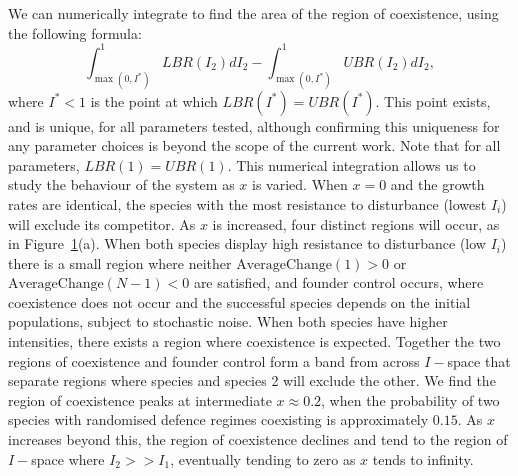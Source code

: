 \begin{figure}[htbp]
\label{gd}
\end{figure}
We can numerically integrate to find the area of the region of coexistence, using the following formula:
\begin{equation}
\int_{\max(0,I^*)}^1 LBR(I_2) dI_2 - \int_{\max(0,I^*)}^1  UBR(I_2) dI_2,
\end{equation}
where $I^*<1$ is the point at which $LBR(I^*)=UBR(I^*)$. This point exists, and is unique, for all parameters tested, although confirming this uniqueness for any parameter choices is beyond the scope of the current work. Note that for all parameters, $LBR(1)=UBR(1)$. This numerical integration allows us to study the behaviour of the system as $x$ is varied. When $x=0$ and the growth rates are identical, the species with the most resistance to disturbance (lowest $I_i$) will exclude its competitor.  As $x$ is increased, four distinct regions will occur, as in Figure~\ref{gd}(a). When both species display high resistance to disturbance (low $I_i$) there is a small region where neither $\text{AverageChange}(1)>0$ or $\text{AverageChange}(N-1)<0$ are satisfied, and founder control occurs, where coexistence does not occur and the successful species depends on the initial populations, subject to stochastic noise. When both species have higher intensities, there exists a region where coexistence is expected. Together the two regions of coexistence and founder control form a band from across $I-$space that separate regions where species and species 2 will exclude the other. We find the region of coexistence peaks at intermediate $x \approx 0.2$, when the probability of two species with randomised defence regimes coexisting is approximately $0.15$. As $x$ increases beyond this, the region of coexistence declines and tend to the region of $I-$space where $I_2>>I_1$, eventually tending to zero as $x$ tends to infinity.

